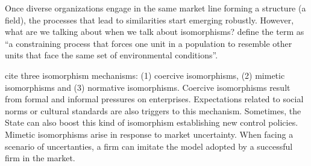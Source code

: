 \documentclass[a4paper, 12pt, openright, oneside, german, french, brazil, english, article]{abntex2}
\begin{document}
	
	
	Once diverse organizations engage in the same market line forming a structure (a field), the processes that lead to similarities start emerging robustly. However, what are we talking about when we talk about isomorphisms?  define the term as ``a constraining process that forces one unit in a population to resemble other units that face the same set of environmental conditions''.
	
	
	 cite three isomorphism mechanisms: (1) coercive isomorphisms, (2) mimetic isomorphisms and (3) normative isomorphisms. Coercive isomorphisms result from formal and informal pressures on enterprises. Expectations related to social norms or cultural standards are also triggers to this mechanism. Sometimes, the State can also boost this kind of isomorphism establishing new control policies. Mimetic isomorphisms arise in response to market uncertainty. When facing a scenario of uncertanties, a firm can imitate the model adopted by a successful firm in the market. 
	
	
\end{document}
